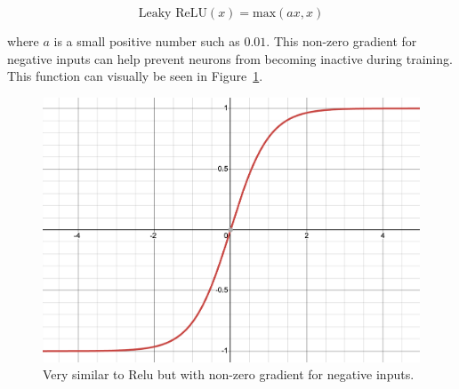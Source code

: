 \begin{equation}
\text{Leaky ReLU}(x) = \text{max}(a x , x)
\end{equation}

where $a$ is a small positive number such as $0.01$. This non-zero gradient for negative inputs can help prevent neurons from becoming inactive during training. This function can visually be seen in Figure~\ref{fig:leaky-relu}.

\begin{figure}[ht]
    \centering
    \includegraphics[width=\textwidth/2]{figures/2-sota/activation/tanh.png}
    \caption[Leaky Relu Activation Function]{Very similar to Relu but with non-zero gradient for negative inputs.}
    \label{fig:leaky-relu}
\end{figure}